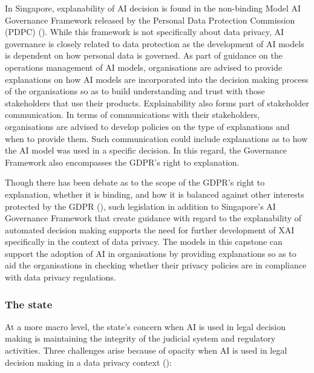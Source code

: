 In Singapore, explanability of AI decision is found in the non-binding Model AI Governance Framework released by the Personal Data Protection Commission (PDPC) (\cite{ai_modelframework}). While this framework is not specifically about data privacy, AI governance is closely related to data protection as the development of AI models is dependent on how personal data is governed. As part of guidance on the operations management of AI models, organisations are advised to provide explanations on how AI models are incorporated into the decision making process of the organisations so as to build understanding and trust with those stakeholders that use their products. Explainability also forms part of stakeholder communication. In terms of communications with their stakeholders, organisations are advised to develop policies on the type of explanations and when to provide them. Such communication could include explanations as to how the AI model was used in a specific decision. In this regard, the Governance Framework also encompasses the GDPR's right to explanation.

Though there has been debate as to the scope of the GDPR's right to explanation, whether it is binding, and how it is balanced against other interests protected by the GDPR (\cite{chesterman2021_transparency}), such legislation in addition to Singapore's AI Governance Framework that create guidance with regard to the explanability of automated decision making supports the need for further development of XAI specifically in the context of data privacy. The models in this capstone can support the adoption of AI in organisations by providing explanations so as to aid the organisations in checking whether their privacy policies are in compliance with data privacy regulations.

\subsubsection{The state}
At a more macro level, the state's concern when AI is used in legal decision making is maintaining the integrity of the judicial system and regulatory activities. Three challenges arise because of opacity when AI is used in legal decision making in a data privacy context (\cite{chesterman2021_opacity}): 

